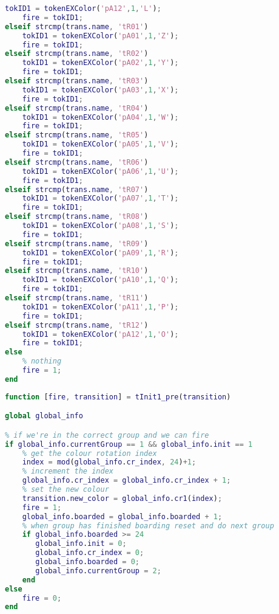 \begin{lstlisting}[language=MATLAB, caption=COMMON\_PRE.m]
    tokID1 = tokenEXColor('pA12',1,'L');
    fire = tokID1;
elseif strcmp(trans.name, 'tR01')
    tokID1 = tokenEXColor('pA01',1,'Z');
    fire = tokID1;
elseif strcmp(trans.name, 'tR02')
    tokID1 = tokenEXColor('pA02',1,'Y');
    fire = tokID1;
elseif strcmp(trans.name, 'tR03')
    tokID1 = tokenEXColor('pA03',1,'X');
    fire = tokID1;
elseif strcmp(trans.name, 'tR04')
    tokID1 = tokenEXColor('pA04',1,'W');
    fire = tokID1;
elseif strcmp(trans.name, 'tR05')
    tokID1 = tokenEXColor('pA05',1,'V');
    fire = tokID1;
elseif strcmp(trans.name, 'tR06')
    tokID1 = tokenEXColor('pA06',1,'U');
    fire = tokID1;
elseif strcmp(trans.name, 'tR07')
    tokID1 = tokenEXColor('pA07',1,'T');
    fire = tokID1;
elseif strcmp(trans.name, 'tR08')
    tokID1 = tokenEXColor('pA08',1,'S');
    fire = tokID1;
elseif strcmp(trans.name, 'tR09')
    tokID1 = tokenEXColor('pA09',1,'R');
    fire = tokID1;
elseif strcmp(trans.name, 'tR10')
    tokID1 = tokenEXColor('pA10',1,'Q');
    fire = tokID1;
elseif strcmp(trans.name, 'tR11')
    tokID1 = tokenEXColor('pA11',1,'P');
    fire = tokID1;
elseif strcmp(trans.name, 'tR12')
    tokID1 = tokenEXColor('pA12',1,'O');
    fire = tokID1;
else
    % nothing
    fire = 1;
end
\end{lstlisting}

\begin{lstlisting}[language=MATLAB, caption=tInit1\_pre.m]
function [fire, transition] = tInit1_pre(transition)

global global_info

% if we're in the correct group and we can fire
if global_info.currentGroup == 1 && global_info.init == 1
    % get the colour rotation index
    index = mod(global_info.cr_index, 24)+1;
    % increment the index
    global_info.cr_index = global_info.cr_index + 1;
    % set the new colour
    transition.new_color = global_info.cr1(index);
    fire = 1;
    global_info.boarded = global_info.boarded + 1;
    % when group has finished boarding reset and do next group
    if global_info.boarded >= 24
       global_info.init = 0;
       global_info.cr_index = 0;
       global_info.boarded = 0;
       global_info.currentGroup = 2;  
    end
else
    fire = 0;
end
\end{lstlisting}

